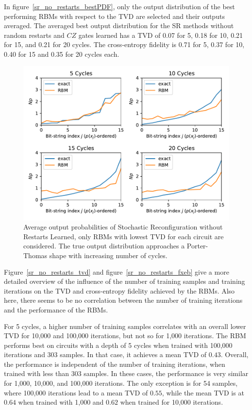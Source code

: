 In figure~\ref{sr_no_restarts_bestPDF}, only the output distribution of the best performing RBMs with respect to the 
TVD are selected and their outputs averaged. The averaged best output distribution for the SR methods without 
random restarts and $CZ$ gates learned has a TVD of 0.07 for 5, 0.18 for 10, 0.21 for 15, and 0.21 for 20 
cycles. The cross-entropy fidelity is 0.71 for 5, 0.37 for 10, 0.40 for 15 and 0.35 for 20 cycles each. 

\begin{figure}[H]
  \centering
  \includegraphics[width=\textwidth]{figures/results/SR-no-restarts-learned/avgBestPDF.pdf}
  \caption[Averaged best performing output probabilities of Stochastic Reconfiguration without Restarts Learned]{
    Average output probabilities of Stochastic Reconfiguration without Restarts Learned, only RBMs with lowest
    TVD for each circuit are considered. The true 
    output distribution approaches a Porter-Thomas shape with increasing number of cycles.}
  \label{fig:sr_no_restarts_bestPDF}
\end{figure}

Figure~\ref{sr_no_restarts_tvd} and figure~\ref{sr_no_restarts_fxeb} give a more detailed overview of the influence of the 
number of training samples and training iterations on the TVD and cross-entropy fidelity achieved by 
the RBMs. Also here, there seems to be no correlation between the number of training
iterations and the performance of the RBMs. 

For 5 cycles, a higher number of training samples 
correlates with an overall lower TVD for 10,000 and 100,000 iterations, but not so for 1,000 iterations. The RBM performs best on 
circuits with a depth of 5 cycles when trained with 100,000 iterations and 303 samples. In that case, 
it achieves a mean TVD of $0.43$. Overall, the performance is independent of the number of 
training iterations, when trained with less than 303 samples. In these cases, the performance is very 
similar for 1,000, 10,000, and 100,000 iterations. The only exception is for 54 samples, where 100,000 iterations lead to a 
mean TVD of $0.55$, while the mean TVD is at $0.64$ when trained with 1,000 and $0.62$ when trained for 
10,000 iterations. 

